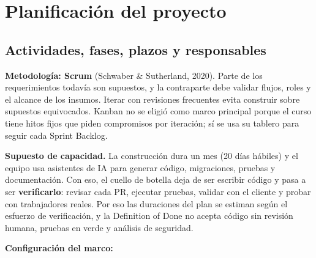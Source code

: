 \documentclass[11pt,a4paper]{article}
\begin{document}
\endgroup

\newpage
\section{Planificación del proyecto}

\subsection{Actividades, fases, plazos y responsables}

\textbf{Metodología: Scrum} (Schwaber \& Sutherland, 2020). Parte de los requerimientos todavía son supuestos, y la contraparte debe validar flujos, roles y el alcance de los insumos. Iterar con revisiones frecuentes evita construir sobre supuestos equivocados. Kanban no se eligió como marco principal porque el curso tiene hitos fijos que piden compromisos por iteración; sí se usa su tablero para seguir cada Sprint Backlog.

\textbf{Supuesto de capacidad.} La construcción dura un mes (20 días hábiles) y el equipo usa asistentes de IA para generar código, migraciones, pruebas y documentación. Con eso, el cuello de botella deja de ser escribir código y pasa a ser \textbf{verificarlo}: revisar cada PR, ejecutar pruebas, validar con el cliente y probar con trabajadores reales. Por eso las duraciones del plan se estiman según el esfuerzo de verificación, y la Definition of Done no acepta código sin revisión humana, pruebas en verde y análisis de seguridad.

\textbf{Configuración del marco:}
\end{document}
